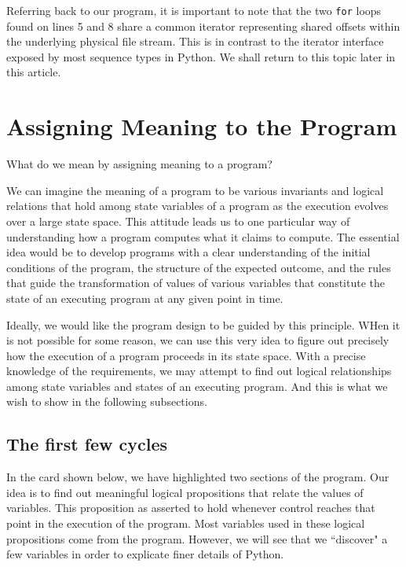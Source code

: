 \documentclass[10pt, a4paper]{article}
\begin{document}
Referring back to our program, it is important to note that the two \texttt{for} loops found on lines 5 and 8 share a common iterator representing shared offsets within the underlying physical file stream. This is in contrast to the iterator interface exposed by most sequence types in Python. We shall return to this topic later in this article.


\section{Assigning Meaning to the Program}
What do we mean by assigning meaning to a program?

We can imagine the meaning of a program to be various invariants and logical relations that hold among state variables of a program as the execution evolves over a large state space. This attitude leads us to one particular way of understanding how a program computes what it claims to compute. The essential idea would be to develop programs with a clear understanding of the initial conditions of the program, the structure of the expected outcome, and the rules that guide the transformation of values of various variables that constitute the state of an executing program at any given point in time.

Ideally, we would like the program design to be guided by this principle. WHen it is not possible for some reason, we can use this very idea to figure out precisely how the execution of a program proceeds in its state space. With a precise knowledge of the requirements, we may attempt to find out logical relationships among state variables and states of an executing program. And this is what we wish to show in the following subsections. 

\subsection{The first few cycles}
In the card shown below, we have highlighted two sections of the program. Our idea is to find out meaningful logical propositions that relate the values of variables. This proposition as asserted to hold whenever control reaches that point in the execution of the program. Most variables used in these logical propositions come from the program. However, we will see that we ``discover" a few variables in order to explicate finer details of Python.
\end{document}
